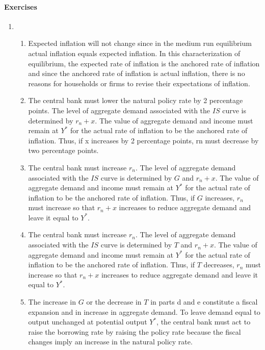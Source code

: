 \documentclass[12pt]{article}
\begin{document}
\paragraph{Exercises}
\begin{enumerate}[label=\arabic*.]
    \item \begin{enumerate}[label=(\alph*)]
        \item Expected inflation will not change since in the medium run equilibrium actual inflation equals expected inflation. In this characterization of equilibrium, the expected rate of inflation is the anchored rate of inflation and since the anchored rate of inflation is actual inflation, there is no reasons for households or firms to revise their expectations of inflation.
        \item The central bank must lower the natural policy rate by 2 percentage points. The level of aggregate demand associated with the $IS$ curve is determined by $r_n + x$. The value of aggregate demand and income must remain at $Y^*$ for the actual rate of inflation to be the anchored rate of inflation. Thus, if x increases by 2 percentage points, rn must decrease by two percentage points.
        \item The central bank must increase $r_n$. The level of aggregate demand associated with the $IS$ curve is determined by $G$ and $r_n + x$. The value of aggregate demand and income must remain at $Y^*$ for the actual rate of inflation to be the anchored rate of inflation. Thus, if $G$ increases, $r_n$ must increase so that $r_n + x$ increases to reduce aggregate demand and leave it equal to $Y^*$.
        \item The central bank must increase $r_n$. The level of aggregate demand associated with the $IS$ curve is determined by $T$ and $r_n + x$. The value of aggregate demand and income must remain at $Y^*$ for the actual rate of inflation to be the anchored rate of inflation. Thus, if $T$ decreases, $r_n$ must increase so that $r_n + x$ increases to reduce aggregate demand and leave it equal to $Y^*$.
        \item The increase in $G$ or the decrease in $T$ in parts d and e constitute a fiscal expansion and in increase in aggregate demand. To leave demand equal to output unchanged at potential output $Y^*$, the central bank must act to raise the borrowing rate by raising the policy rate because the fiscal changes imply an increase in the natural policy rate.
    \end{enumerate}

\end{enumerate}
\end{document}
